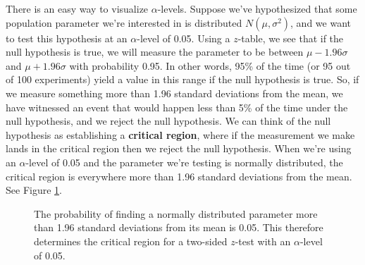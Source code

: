 There is an easy way to visualize $\alpha$-levels.  Suppose we've hypothesized that some population parameter we're interested in is distributed $N(\mu,\sigma^2)$, and we want to test this hypothesis at an $\alpha$-level of 0.05.  Using a $z$-table, we see that if the null hypothesis is true, we will measure the parameter to be between $\mu - 1.96\sigma$ and $\mu + 1.96\sigma$ with probability 0.95. In other words, 95\% of the time (or 95 out of 100 experiments) yield a value in this range if the null hypothesis is true.  So, if we measure something more than 1.96 standard deviations from the mean, we have witnessed an event that would happen less than 5\% of the time under the null hypothesis, and we reject the null hypothesis.  We can think of the null hypothesis as establishing a \textbf{critical region},  where if the measurement we make lands in the critical region then we reject the null hypothesis.  When we're using an $\alpha$-level of 0.05 and the parameter we're testing is normally distributed, the critical region is everywhere more than 1.96 standard deviations from the mean.  See Figure \ref{fig:twosidedz}.

\begin{figure}[h!]
\begin{center}
\caption{\label{fig:twosidedz} The probability of finding a normally distributed parameter more than 1.96 standard deviations from its mean is 0.05.  This therefore determines the critical region for a two-sided $z$-test with an $\alpha$-level of 0.05.}
\end{center}\end{figure}

